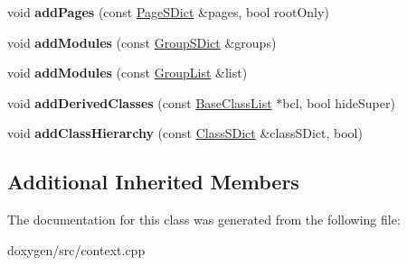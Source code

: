 \begin{DoxyCompactItemize}
void {\bfseries add\+Pages} (const \mbox{\hyperlink{class_page_s_dict}{Page\+S\+Dict}} \&pages, bool root\+Only)
\item 
\mbox{\label{class_nesting_context_1_1_private_a5f18894433df57981b5d7cdc1188f18e}} 
void {\bfseries add\+Modules} (const \mbox{\hyperlink{class_group_s_dict}{Group\+S\+Dict}} \&groups)
\item 
\mbox{\label{class_nesting_context_1_1_private_a6c0bf59b8e730984d63239e11d2598f3}} 
void {\bfseries add\+Modules} (const \mbox{\hyperlink{class_group_list}{Group\+List}} \&list)
\item 
\mbox{\label{class_nesting_context_1_1_private_a0dc92805c23de7679ec1fec12978bb85}} 
void {\bfseries add\+Derived\+Classes} (const \mbox{\hyperlink{class_base_class_list}{Base\+Class\+List}} $\ast$bcl, bool hide\+Super)
\item 
\mbox{\label{class_nesting_context_1_1_private_a55a1b82d70060dc17bb4bb6b490d971b}} 
void {\bfseries add\+Class\+Hierarchy} (const \mbox{\hyperlink{class_class_s_dict}{Class\+S\+Dict}} \&class\+S\+Dict, bool)
\end{DoxyCompactItemize}
\subsection*{Additional Inherited Members}


The documentation for this class was generated from the following file\+:\begin{DoxyCompactItemize}
\item 
doxygen/src/context.\+cpp\end{DoxyCompactItemize}
